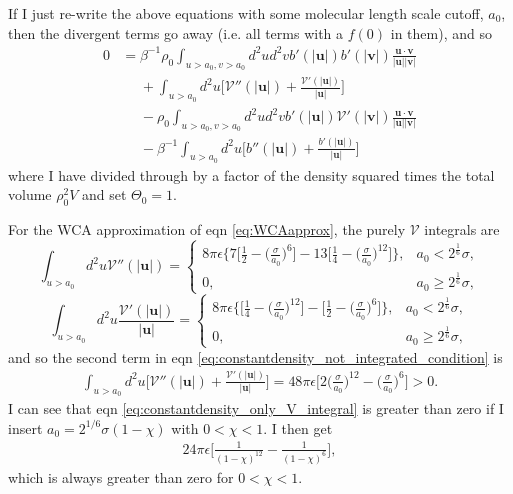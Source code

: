 \documentclass{article}
\begin{document}
If I just re-write the above equations with some molecular length scale cutoff, $a_0$, then
the divergent terms go away (i.e. all terms with a $f(0)$ in them), and so
\begin{align}\label{eq:constantdensity_not_integrated_condition}
  0
  &=\beta^{-1}\rho_0\int_{u>a_0,v>a_0} d^2ud^2v
    b'(|\bm{u}|)b'(|\bm{v}|)
    \frac{\bm{u}\cdot\bm{v}}{|\bm{u}||\bm{v}|}\nonumber\\
  &\phantom{=}+\int_{u>a_0} d^2u
    \bigg[\mathcal{V}''(|\bm{u}|)
    +\frac{\mathcal{V}'(|\bm{u}|)}{|\bm{u}|}\bigg]\nonumber\\
  &\phantom{=}
    -\rho_0\int_{u>a_0,v>a_0} d^2ud^2v
    b'(|\bm{u}|)\mathcal{V}'(|\bm{v}|)
    \frac{\bm{u}\cdot\bm{v}}{|\bm{u}||\bm{v}|}\nonumber\\
  &\phantom{=}-\beta^{-1}\int_{u>a_0} d^2u
    \bigg[b''(|\bm{u}|)
    +\frac{b'(|\bm{u}|)}{|\bm{u}|}\bigg]
\end{align}
where I have divided through by a factor of the density squared times the total
volume $\rho_0^2V$ and set $\Theta_0=1$.

For the WCA approximation of eqn \ref{eq:WCAapprox}, the purely $\mathcal{V}$ integrals are
\begin{equation}
  \int_{u>a_0} d^2u\mathcal{V}''(|\bm{u}|) =
  \begin{cases}
    8\pi\epsilon\bigg\{7\bigg[\frac{1}{2}-\bigg(\frac{\sigma}{a_0}\bigg)^6\bigg]
    -13\bigg[\frac{1}{4}-\bigg(\frac{\sigma}{a_0}\bigg)^{12}\bigg]\bigg\},
    &a_0<2^{\frac{1}{6}}\sigma,\\
    0,&a_0\geq 2^{\frac{1}{6}}\sigma,
  \end{cases}
\end{equation}
\begin{equation}
  \int_{u>a_0} d^2u\frac{\mathcal{V}'(|\bm{u}|)}{|\bm{u}|} =
  \begin{cases}
    8\pi\epsilon\bigg\{\bigg[\frac{1}{4}-\bigg(\frac{\sigma}{a_0}\bigg)^{12}\bigg]
    -\bigg[\frac{1}{2}-\bigg(\frac{\sigma}{a_0}\bigg)^6\bigg]\bigg\},
    &a_0<2^{\frac{1}{6}}\sigma,\\
    0,&a_0\geq 2^{\frac{1}{6}}\sigma,
  \end{cases}
\end{equation}
and so the second term in eqn \ref{eq:constantdensity_not_integrated_condition} is
\begin{align}\label{eq:constantdensity_only_V_integral}
  \int_{u>a_0} d^2u\bigg[\mathcal{V}''(|\bm{u}|)
  + \frac{\mathcal{V}'(|\bm{u}|)}{|\bm{u}|}\bigg]
  = 48\pi\epsilon\bigg[2\bigg(\frac{\sigma}{a_0}\bigg)^{12}
  -\bigg(\frac{\sigma}{a_0}\bigg)^6\bigg]>0.
\end{align}
I can see that eqn \ref{eq:constantdensity_only_V_integral} is greater than zero if I insert
$a_0=2^{1/6}\sigma(1-\chi)$ with $0<\chi<1$. I then get
\begin{align}
  24\pi\epsilon\bigg[\frac{1}{(1-\chi)^{12}}-\frac{1}{(1-\chi)^6}\bigg],
\end{align}
which is always greater than zero for $0<\chi<1$.
\end{document}
